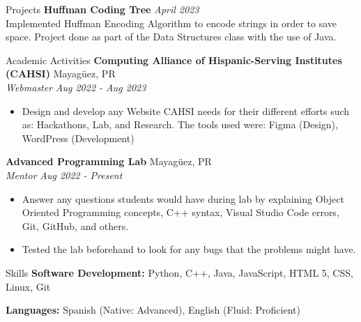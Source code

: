 \documentclass{resume} %
\begin{document}
\begin{rSection}{Projects}
{\bf Huffman Coding Tree} \hfill {\em April 2023}\\
Implemented Huffman Encoding Algorithm to encode strings in order to save space. Project done as part of the Data Structures class with the use of Java.
\end{rSection}
\begin{rSection}{Academic Activities}
{\bf Computing Alliance of Hispanic-Serving Institutes (CAHSI)} \hfill {Mayagüez, PR} 
\\
\textit{Webmaster} \hfill {\em Aug 2022 - Aug 2023}
\vspace{-0.2\baselineskip} %
\begin{itemize}[noitemsep]
    \item Design and develop any Website CAHSI needs for their different efforts such as: Hackathons, Lab, and Research. The tools used were: Figma (Design), WordPress (Development) 
\end{itemize}

{\bf Advanced Programming Lab } \hfill {Mayagüez, PR}
\\
\textit{Mentor} \hfill {\em Aug 2022 - Present}
\vspace{-0.2\baselineskip} %
\begin{itemize}[noitemsep]
    \item Answer any questions students would have during lab by explaining Object Oriented Programming concepts, C++ syntax, Visual Studio Code errors, Git, GitHub, and others.
    \item Tested the lab beforehand to look for any bugs that the problems might have. 
\end{itemize}
\end{rSection}
\begin{rSection}{Skills}
{\bf Software Development:} Python, C++, Java, JavaScript, HTML 5, CSS, Linux, Git

{\bf Languages: }Spanish (Native: Advanced), English (Fluid: Proficient)
\end{rSection}
\end{document}
